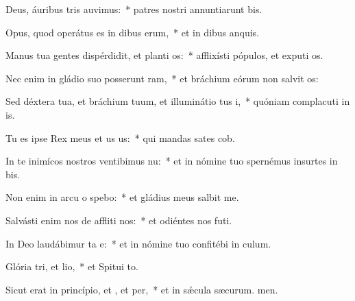 \item Deus, áuribus tris auvimus:~* patres nostri annuntiarunt bis.
\item Opus, quod operátus es in dibus erum,~* et in dibus anquis.
\item Manus tua gentes dispérdidit, et planti os:~* afflixísti pópulos, et exputi os.
\item Nec enim in gládio suo posserunt ram,~* et bráchium eórum non salvit os:
\item Sed déxtera tua, et bráchium tuum, et illuminátio tus i,~* quóniam complacuti in is.
\item Tu es ipse Rex meus et us us:~* qui mandas sates cob.
\item In te inimícos nostros ventibimus nu:~* et in nómine tuo spernémus insurtes in bis.
\item Non enim in arcu o spebo:~* et gládius meus  salbit me.
\item Salvásti enim nos de affliti nos:~* et odiéntes nos futi.
\item In Deo laudábimur ta e:~* et in nómine tuo confitébi in culum.
\item Glória tri, et lio,~* et Spitui to.
\item Sicut erat in princípio, et , et per,~* et in sǽcula sæcurum. men.
